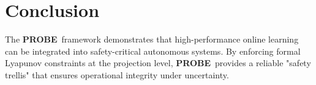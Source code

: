 \documentclass[11pt,a4paper]{article}
\newcommand{\probe}{\textbf{PROBE}}
\begin{document}
\section{Conclusion}
The \probe\ framework demonstrates that high-performance online learning can be integrated into safety-critical autonomous systems. By enforcing formal Lyapunov constraints at the projection level, \probe\ provides a reliable "safety trellis" that ensures operational integrity under uncertainty.
\end{document}
